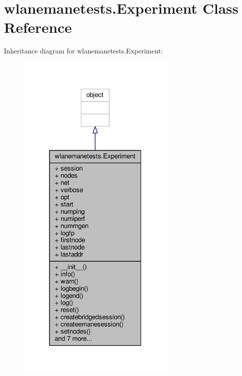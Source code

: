 \hypertarget{classwlanemanetests_1_1_experiment}{\section{wlanemanetests.\+Experiment Class Reference}
\label{classwlanemanetests_1_1_experiment}
}


Inheritance diagram for wlanemanetests.\+Experiment\+:
\nopagebreak
\begin{figure}[H]
\begin{center}
\leavevmode
\includegraphics[width=220pt]{classwlanemanetests_1_1_experiment__inherit__graph}
\end{center}
\end{figure}


